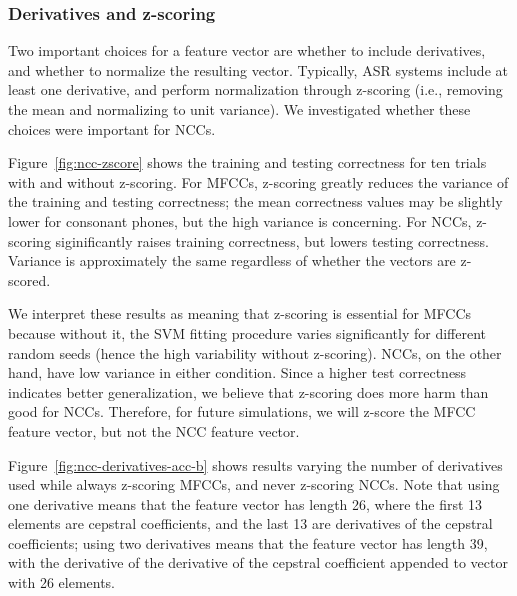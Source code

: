 \subsubsection{Derivatives and z-scoring}

Two important choices for a feature vector
are whether to include derivatives,
and whether to normalize the resulting vector.
Typically, ASR systems include at least
one derivative, and perform normalization
through z-scoring
(i.e., removing the mean
and normalizing to unit variance).
We investigated whether these
choices were important for NCCs.


Figure~\ref{fig:ncc-zscore} shows
the training and testing correctness
for ten trials
with and without z-scoring.
For MFCCs,
z-scoring greatly reduces the variance
of the training and testing correctness;
the mean correctness values
may be slightly lower
for consonant phones,
but the high variance is concerning.
For NCCs,
z-scoring siginificantly
raises training correctness,
but lowers testing correctness.
Variance is approximately the same
regardless of whether the vectors are z-scored.

We interpret these results
as meaning that z-scoring is essential
for MFCCs because without it,
the SVM fitting procedure
varies significantly for
different random seeds
(hence the high variability without z-scoring).
NCCs, on the other hand,
have low variance in either condition.
Since a higher test correctness indicates
better generalization,
we believe that z-scoring
does more harm than good for NCCs.
Therefore, for future simulations,
we will z-score the MFCC feature vector,
but not the NCC feature vector.


Figure~\ref{fig:ncc-derivatives-acc-b} shows
results varying the number of derivatives
used while always z-scoring MFCCs,
and never z-scoring NCCs.
Note that using one derivative means
that the feature vector has
length 26,
where the first 13 elements
are cepstral coefficients,
and the last 13 are derivatives
of the cepstral coefficients;
using two derivatives means that
the feature vector has length 39,
with the derivative of the
derivative of the cepstral coefficient
appended to vector with 26 elements.

